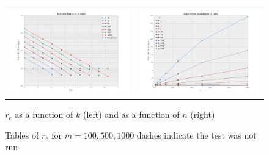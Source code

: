 \begin{figure}
\begin{tabular}{cc}
\includegraphics[width=\plotwidth]{tratio1000.png} & \includegraphics[width=\plotwidth]{tratioarc1000.png}\\
\end{tabular}
\caption{$r_e$ as a function of $k$ (left) and as a function of $n$ (right) }
\label{fig:1000plot}
\end{figure}
\begin{figure}
\centering

\caption{Tables of $r_e$ for $m=100,500,1000$ dashes indicate the test was not run}
\label{table:sfm}
\end{figure}

